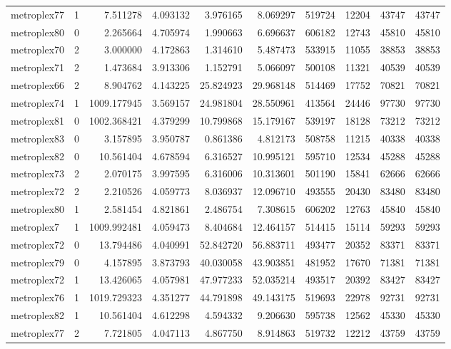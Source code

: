 \begin{longtable}{|l|r|r|r|r|r|r|r|r|r|}
metroplex77 & 1 & 7.511278 & 4.093132 & 3.976165 & 8.069297 & 519724 & 12204 & 43747 & 43747 \\
metroplex80 & 0 & 2.265664 & 4.705974 & 1.990663 & 6.696637 & 606182 & 12743 & 45810 & 45810 \\
metroplex70 & 2 & 3.000000 & 4.172863 & 1.314610 & 5.487473 & 533915 & 11055 & 38853 & 38853 \\
metroplex71 & 2 & 1.473684 & 3.913306 & 1.152791 & 5.066097 & 500108 & 11321 & 40539 & 40539 \\
metroplex66 & 2 & 8.904762 & 4.143225 & 25.824923 & 29.968148 & 514469 & 17752 & 70821 & 70821 \\
metroplex74 & 1 & 1009.177945 & 3.569157 & 24.981804 & 28.550961 & 413564 & 24446 & 97730 & 97730 \\
metroplex81 & 0 & 1002.368421 & 4.379299 & 10.799868 & 15.179167 & 539197 & 18128 & 73212 & 73212 \\
metroplex83 & 0 & 3.157895 & 3.950787 & 0.861386 & 4.812173 & 508758 & 11215 & 40338 & 40338 \\
metroplex82 & 0 & 10.561404 & 4.678594 & 6.316527 & 10.995121 & 595710 & 12534 & 45288 & 45288 \\
metroplex73 & 2 & 2.070175 & 3.997595 & 6.316006 & 10.313601 & 501190 & 15841 & 62666 & 62666 \\
metroplex72 & 2 & 2.210526 & 4.059773 & 8.036937 & 12.096710 & 493555 & 20430 & 83480 & 83480 \\
metroplex80 & 1 & 2.581454 & 4.821861 & 2.486754 & 7.308615 & 606202 & 12763 & 45840 & 45840 \\
metroplex7 & 1 & 1009.992481 & 4.059473 & 8.404684 & 12.464157 & 514415 & 15114 & 59293 & 59293 \\
metroplex72 & 0 & 13.794486 & 4.040991 & 52.842720 & 56.883711 & 493477 & 20352 & 83371 & 83371 \\
metroplex79 & 0 & 4.157895 & 3.873793 & 40.030058 & 43.903851 & 481952 & 17670 & 71381 & 71381 \\
metroplex72 & 1 & 13.426065 & 4.057981 & 47.977233 & 52.035214 & 493517 & 20392 & 83427 & 83427 \\
metroplex76 & 1 & 1019.729323 & 4.351277 & 44.791898 & 49.143175 & 519693 & 22978 & 92731 & 92731 \\
metroplex82 & 1 & 10.561404 & 4.612298 & 4.594332 & 9.206630 & 595738 & 12562 & 45330 & 45330 \\
metroplex77 & 2 & 7.721805 & 4.047113 & 4.867750 & 8.914863 & 519732 & 12212 & 43759 & 43759 \\

\end{longtable}
